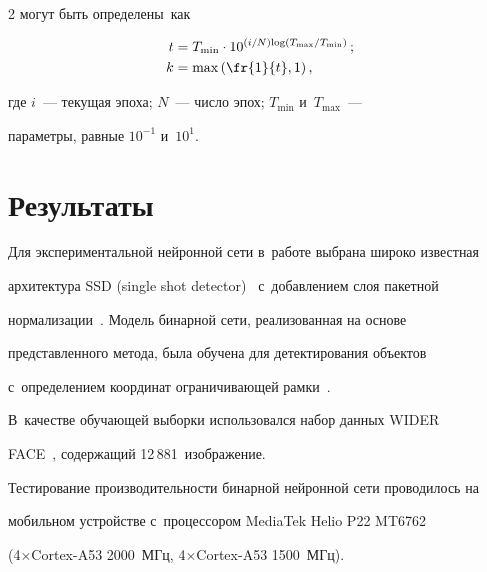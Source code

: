 \begin{multicols}{2}
могут быть опре\-де\-ле\-ны~как





\noindent


\begin{align*}


t &= T_{\min} \cdot 10^{(i/N)\mathrm{log}\left (T_{\max}/T_{\min}\right)}\,;\\


k&= \max\left( \fr{1}{t}, 1\right),


\end{align*}


где $i$~--- текущая эпоха; $N$~--- чис\-ло эпох; $T_{\min}$ и~$T_{\max}$~---  


па\-ра\-мет\-ры, рав\-ные $10^{-1}$ и~$10^1$.





\vspace*{-6pt}





\section{Результаты}





  Для экспериментальной нейронной сети в~работе выбрана широко известная 


архитектура SSD (single shot detector)~\cite{9-mal} с~до\-бав\-ле\-ни\-ем слоя пакетной 


нормализации~\cite{10-mal}. Модель бинарной сети, реализованная на основе 


пред\-став\-лен\-но\-го метода, была обуче\-на для детектирования объектов 


с~определением координат огра\-ни\-чи\-ва\-ющей рамки~\cite{12-mal}. 


В~качестве обуча\-ющей выборки использовался набор данных WIDER 


FACE~\cite{11-mal}, содержащий 12\,881~изоб\-ра\-же\-ние. 


  


  Тестирование производительности бинарной нейронной сети проводилось на 


мобильном устройстве с~процессором MediaTek Helio P22 MT6762  


(4\;$\times$\;Cortex-A53 2000~МГц, 4\;$\times$\;Cortex-A53 1500~МГц). 



\end{multicols}
